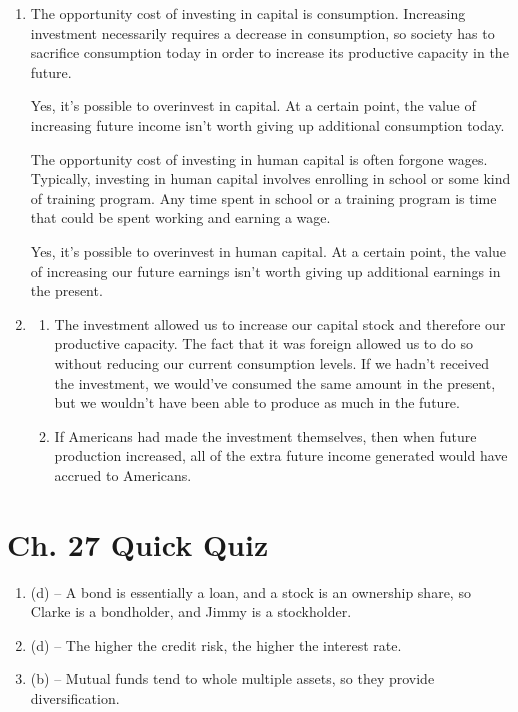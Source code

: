 \documentclass{article}
\begin{document}
\begin{enumerate}
\begin{enumerate}
	\end{enumerate}

\item The opportunity cost of investing in capital is consumption. Increasing investment necessarily requires a decrease in consumption, so society has to sacrifice consumption today in order to increase its productive capacity in the future.

Yes, it’s possible to overinvest in capital. At a certain point, the value of increasing future income isn’t worth giving up additional consumption today. 

The opportunity cost of investing in human capital is often forgone wages. Typically, investing in human capital involves enrolling in school or some kind of training program. Any time spent in school or a training program is time that could be spent working and earning a wage.

Yes, it’s possible to overinvest in human capital. At a certain point, the value of increasing our future earnings isn’t worth giving up additional earnings in the present.

\item

	\begin{enumerate}
	
	\item The investment allowed us to increase our capital stock and therefore our productive capacity. The fact that it was foreign allowed us to do so without reducing our current consumption levels. If we hadn’t received the investment, we would’ve consumed the same amount in the present, but we wouldn’t have been able to produce as much in the future.
	
	\item If Americans had made the investment themselves, then when future production increased, all of the extra future income generated would have accrued to Americans.
	
	\end{enumerate}

\end{enumerate}

\section*{Ch. 27 Quick Quiz}

\begin{enumerate}

\item (d) -- A bond is essentially a loan, and a stock is an ownership share, so Clarke is a bondholder, and Jimmy is a stockholder.

\item (d) -- The higher the credit risk, the higher the interest rate.

\item (b) -- Mutual funds tend to whole multiple assets, so they provide diversification.

\end{enumerate}
\end{document}
